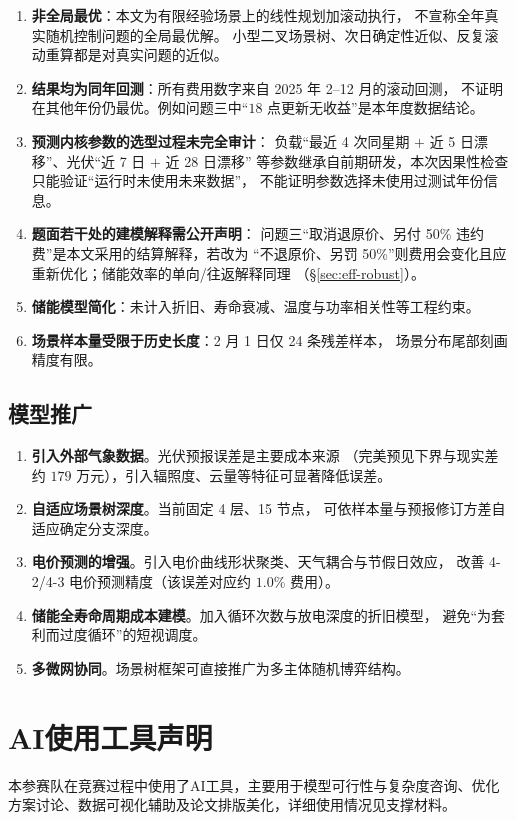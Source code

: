\begin{enumerate}[itemsep=4pt,topsep=4pt]
  \item \textbf{非全局最优}：本文为有限经验场景上的线性规划加滚动执行，
        不宣称全年真实随机控制问题的全局最优解。
        小型二叉场景树、次日确定性近似、反复滚动重算都是对真实问题的近似。

  \item \textbf{结果均为同年回测}：所有费用数字来自 2025 年 2--12 月的滚动回测，
        不证明在其他年份仍最优。例如问题三中“$18$ 点更新无收益”是本年度数据结论。

  \item \textbf{预测内核参数的选型过程未完全审计}：
        负载“最近 4 次同星期 $+$ 近 5 日漂移”、光伏“近 7 日 $+$ 近 28 日漂移”
        等参数继承自前期研发，本次因果性检查只能验证“运行时未使用未来数据”，
        不能证明参数选择未使用过测试年份信息。

  \item \textbf{题面若干处的建模解释需公开声明}：
        问题三“取消退原价、另付 50\% 违约费”是本文采用的结算解释，若改为
        “不退原价、另罚 50\%”则费用会变化且应重新优化；储能效率的单向/往返解释同理
        （\S\ref{sec:eff-robust}）。

  \item \textbf{储能模型简化}：未计入折旧、寿命衰减、温度与功率相关性等工程约束。

  \item \textbf{场景样本量受限于历史长度}：2 月 1 日仅 24 条残差样本，
        场景分布尾部刻画精度有限。
\end{enumerate}

\subsection{模型推广}

\begin{enumerate}[itemsep=2pt,topsep=3pt]
  \item \textbf{引入外部气象数据}。光伏预报误差是主要成本来源
        （完美预见下界与现实差约 $179$ 万元），引入辐照度、云量等特征可显著降低误差。
  \item \textbf{自适应场景树深度}。当前固定 4 层、15 节点，
        可依样本量与预报修订方差自适应确定分支深度。
  \item \textbf{电价预测的增强}。引入电价曲线形状聚类、天气耦合与节假日效应，
        改善 4-2/4-3 电价预测精度（该误差对应约 $1.0\%$ 费用）。
  \item \textbf{储能全寿命周期成本建模}。加入循环次数与放电深度的折旧模型，
        避免“为套利而过度循环”的短视调度。
  \item \textbf{多微网协同}。场景树框架可直接推广为多主体随机博弈结构。
\end{enumerate}


\section{AI使用工具声明}
本参赛队在竞赛过程中使用了AI工具，主要用于模型可行性与复杂度咨询、优化方案讨论、数据可视化辅助及论文排版美化，详细使用情况见支撑材料。
